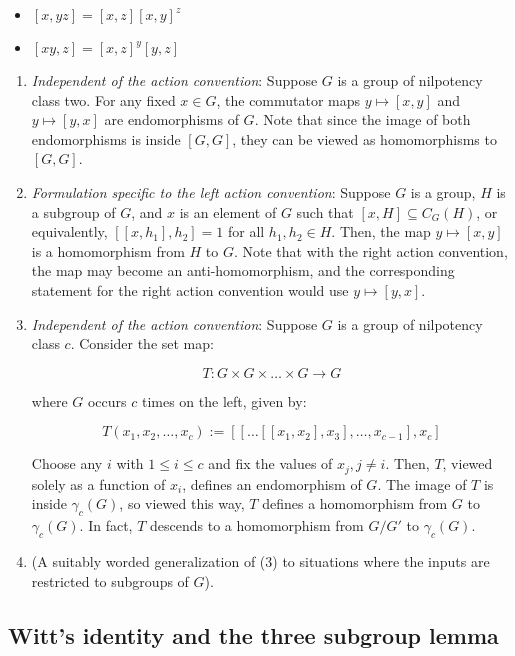 \documentclass{ucetd}
\begin{document}
\begin{itemize}
\item $[x,yz] = [x,z][x,y]^z$
\item $[xy,z] = [x,z]^y[y,z]$
\end{itemize}

\begin{lemma}
  \begin{enumerate}
  \item {\em Independent of the action convention}: Suppose $G$ is a
    group of nilpotency class two. For any fixed $x \in G$, the
    commutator maps $y \mapsto [x,y]$ and $y \mapsto [y,x]$ are
    endomorphisms of $G$. Note that since the image of both
    endomorphisms is inside $[G,G]$, they can be viewed as
    homomorphisms to $[G,G]$.
  \item {\em Formulation specific to the left action convention}:
    Suppose $G$ is a group, $H$ is a subgroup of $G$, and $x$ is an
    element of $G$ such that $[x,H] \subseteq C_G(H)$, or
    equivalently, $[[x,h_1],h_2] = 1$ for all $h_1, h_2 \in H$. Then,
    the map $y \mapsto [x,y]$ is a homomorphism from $H$ to $G$. Note
    that with the right action convention, the map may become an
    anti-homomorphism, and the corresponding statement for the right
    action convention would use $y \mapsto [y,x]$.
  \item {\em Independent of the action convention}: Suppose $G$ is a
    group of nilpotency class $c$. Consider the set map:

    $$T: G \times G \times \dots \times G \to G$$

    where $G$ occurs $c$ times on the left, given by:

    $$T(x_1,x_2,\dots,x_c) := [[ \dots [[x_1,x_2],x_3],\dots,x_{c-1}],x_c]$$

    Choose any $i$ with $1 \le i \le c$ and fix the values of $x_j, j
    \ne i$. Then, $T$, viewed solely as a function of $x_i$, defines
    an endomorphism of $G$. The image of $T$ is inside $\gamma_c(G)$,
    so viewed this way, $T$ defines a homomorphism from $G$ to
    $\gamma_c(G)$. In fact, $T$ descends to a homomorphism from
    $G/G'$ to $\gamma_c(G)$.
  \item (A suitably worded generalization of (3) to situations where
    the inputs are restricted to subgroups of $G$).
  \end{enumerate}
\end{lemma}

\subsection{Witt's identity and the three subgroup lemma}\label{appsec:witt-three-subgroup}
\end{document}
